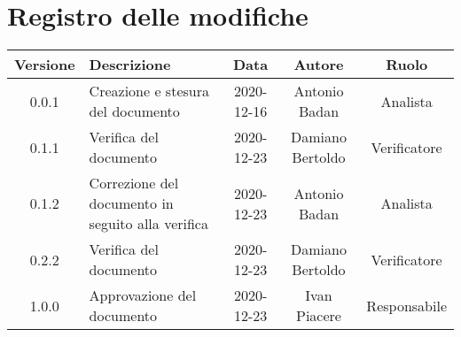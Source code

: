 \section*{Registro delle modifiche}

\begin{center}
	\begin{longtable}{|c|p{5cm}|c|c|c|}
	\hline
	\rowcolor{lighter-grayer}
	\textbf{Versione} & \textbf{Descrizione} & \textbf{Data} & \textbf{Autore} & \textbf{Ruolo} \\
	\hline
	\endfirsthead

	
	\hline
	0.0.1 & Creazione e stesura del documento & 2020-12-16 & Antonio Badan & Analista \\
	\hline
	0.1.1 & Verifica del documento & 2020-12-23 & Damiano Bertoldo & Verificatore \\
	\hline
	0.1.2 & Correzione del documento in seguito alla verifica & 2020-12-23 & Antonio Badan & Analista \\
	\hline
	0.2.2 & Verifica del documento & 2020-12-23 & Damiano Bertoldo & Verificatore \\
	\hline
	1.0.0 & Approvazione del documento & 2020-12-23 & Ivan Piacere & Responsabile \\
	\hline

	\end{longtable}
\end{center}